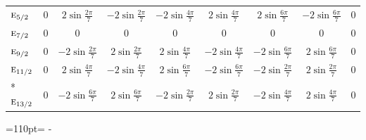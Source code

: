\documentclass[10pt,a4paper]{article}
\newcommand{\needspace}[1]{\par\penalty-100\begingroup\dimen0=#1\relax\dimen2=\pagegoal
  \advance\dimen2-\pagetotal\ifdim\dimen0>\dimen2\relax\ifdim\dimen2>0pt\vfil\break\fi\fi
  \endgroup}
\numberwithin{equation}{section}
\newcommand{\irr}[1]{\text{\normalfont\scshape #1}}
\begin{document}
{{\begin{longtable}{@{}lcccccccc@{}}
$\irr{e}_{5/2}$ & $0$ & $2\sin\tfrac{2\pi}{7}$ & $-2\sin\tfrac{2\pi}{7}$ & $-2\sin\tfrac{4\pi}{7}$ & $2\sin\tfrac{4\pi}{7}$ & $2\sin\tfrac{6\pi}{7}$ & $-2\sin\tfrac{6\pi}{7}$ & $0$\\
$\irr{e}_{7/2}$ & $0$ & $0$ & $0$ & $0$ & $0$ & $0$ & $0$ & $0$\\
$\irr{e}_{9/2}$ & $0$ & $-2\sin\tfrac{2\pi}{7}$ & $2\sin\tfrac{2\pi}{7}$ & $2\sin\tfrac{4\pi}{7}$ & $-2\sin\tfrac{4\pi}{7}$ & $-2\sin\tfrac{6\pi}{7}$ & $2\sin\tfrac{6\pi}{7}$ & $0$\\
$\irr{e}_{11/2}$ & $0$ & $2\sin\tfrac{4\pi}{7}$ & $-2\sin\tfrac{4\pi}{7}$ & $2\sin\tfrac{6\pi}{7}$ & $-2\sin\tfrac{6\pi}{7}$ & $-2\sin\tfrac{2\pi}{7}$ & $2\sin\tfrac{2\pi}{7}$ & $0$\\*
$\irr{e}_{13/2}$ & $0$ & $-2\sin\tfrac{6\pi}{7}$ & $2\sin\tfrac{6\pi}{7}$ & $-2\sin\tfrac{2\pi}{7}$ & $2\sin\tfrac{2\pi}{7}$ & $-2\sin\tfrac{4\pi}{7}$ & $2\sin\tfrac{4\pi}{7}$ & $0$\\
\bottomrule\end{longtable}}}
\needspace{110pt}
\end{document}
